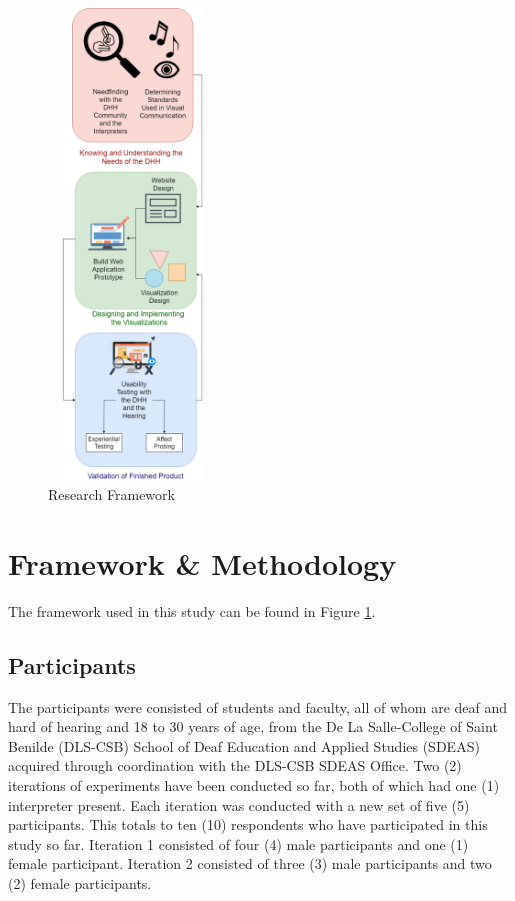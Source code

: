 \begin{figure}
     \centering
    \includegraphics[width=4.5cm,height=12.5cm]{figures/systemDesignFlowchartLite.png}
    \caption{Research Framework}
    \label{fig:research_framework}
\end{figure}

\section{Framework \& Methodology}
    The framework used in this study can be found in Figure \ref{fig:research_framework}.

    
\subsection{Participants}
 The participants were consisted of students and faculty, all of whom are deaf and hard of hearing and 18 to 30 years of age, from the De La Salle-College of Saint Benilde (DLS-CSB) School of Deaf Education and Applied Studies (SDEAS) acquired through coordination with the DLS-CSB SDEAS Office. Two (2) iterations of experiments have been conducted so far, both of which had one (1) interpreter present. Each iteration was conducted with a new set of five (5) participants. This totals to ten (10) respondents who have participated in this study so far. Iteration 1 consisted of four (4) male participants and one (1) female participant. Iteration 2 consisted of three (3) male participants and two (2) female participants.
 
